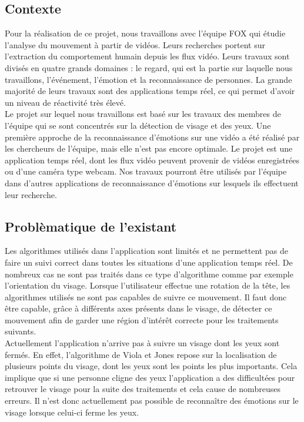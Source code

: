 \subsection{Contexte}
Pour la réalisation de ce projet, nous travaillons avec l'équipe FOX qui étudie
l'analyse du mouvement à partir de vidéos. Leurs recherches portent
sur l'extraction du comportement humain depuis les flux vidéo.  Leurs travaux sont
divisés en quatre grands domaines : le regard, qui est la partie sur laquelle nous travaillons, l'événement, l'émotion et la
reconnaissance de personnes. La grande majorité de leurs travaux sont
des applications temps réel, ce qui permet d'avoir un niveau de réactivité très élevé.\\ 

Le projet sur lequel nous travaillons est basé sur les travaux des membres de l'équipe qui se sont concentrés sur la
détection de visage et des yeux. Une première approche de la reconnaissance d'émotions sur une vidéo a été 
réalisé par les chercheurs de l'équipe, mais elle n'est pas encore optimale. Le projet est une application temps réel, 
dont les flux vidéo peuvent provenir de vidéos enregistrées ou d'une caméra type webcam. Nos travaux pourront être utilisés par
l'équipe dans d'autres applications de reconnaissance d'émotions sur lesquels ils effectuent leur recherche.\\

\subsection{Problèmatique de l'existant}
Les algorithmes utilisés dans l'application sont limités et ne permettent pas de faire un suivi correct
dans toutes les situations d'une application temps réel. De nombreux cas ne sont
pas traités dans ce type d'algorithme comme par exemple l'orientation du visage. Lorsque
l'utilisateur effectue une rotation de la tête, les algorithmes utilisés ne sont pas capables
de suivre ce mouvement. Il faut donc être capable, grâce à différents axes présents dans le visage, de détecter
ce mouvement afin de garder une région d'intérêt correcte pour les traitements suivants.\\

Actuellement l'application n'arrive pas à suivre un visage dont les yeux sont fermés. En effet,
l'algorithme de Viola et Jones repose sur la localisation de plusieurs points du visage, dont 
les yeux sont les points les plus importants. Cela implique que si une personne cligne des yeux
l'application a des difficultées pour retrouver le visage pour la suite des traitements et cela 
cause de nombreuses erreurs. Il n'est donc actuellement pas possible de reconnaître des émotions
sur le visage lorsque celui-ci ferme les yeux.\\

